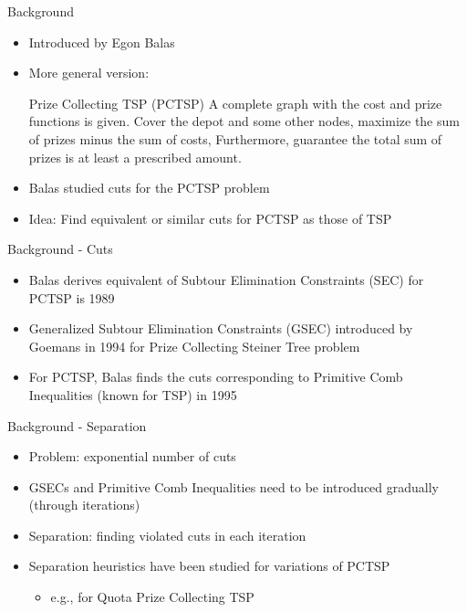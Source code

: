 \documentclass[10pt]{beamer}
\begin{document}
\begin{frame}[fragile]{Background}
\begin{itemize}
\item<1-> Introduced by Egon Balas \cite{Balas89}
\item<2-> More general version:
	\begin{alertblock}{Prize Collecting TSP (PCTSP)}
		A complete graph with the cost and prize functions is given. Cover the depot and some other nodes, maximize the sum of prizes minus the sum of costs, Furthermore, guarantee the total sum of prizes is at least a \alert{prescribed} amount.
	\end{alertblock}
\item<3-> Balas studied cuts for the PCTSP problem
\item<4-> Idea: Find equivalent or similar cuts for PCTSP as those of TSP
\end{itemize}
\end{frame}

\begin{frame}[fragile]{Background - Cuts}
\begin{itemize}
\item<1-> Balas derives equivalent of Subtour Elimination Constraints (SEC) for PCTSP is 1989 \cite{Balas89}
\item<2-> \alert{Generalized Subtour Elimination Constraints (GSEC)} introduced by Goemans in 1994 \cite{Goemans94} for Prize Collecting Steiner Tree problem
\item<3-> For PCTSP, Balas finds the cuts corresponding to \alert{Primitive Comb Inequalities} (known for TSP) in 1995 \cite{Balas95}
\end{itemize}
\end{frame}

\begin{frame}[fragile]{Background - Separation}
\begin{itemize}
\item<1-> Problem: exponential number of cuts
\item<2-> GSECs and Primitive Comb Inequalities need to be introduced gradually (through iterations)
\item<3-> \alert{Separation:} finding violated cuts in each iteration
\item<4-> Separation heuristics have been studied for variations of PCTSP
\begin{itemize}
\item<5-> e.g., for Quota Prize Collecting TSP \cite{Berube09}
\end{itemize}
\end{itemize}
\end{frame}
\end{document}
